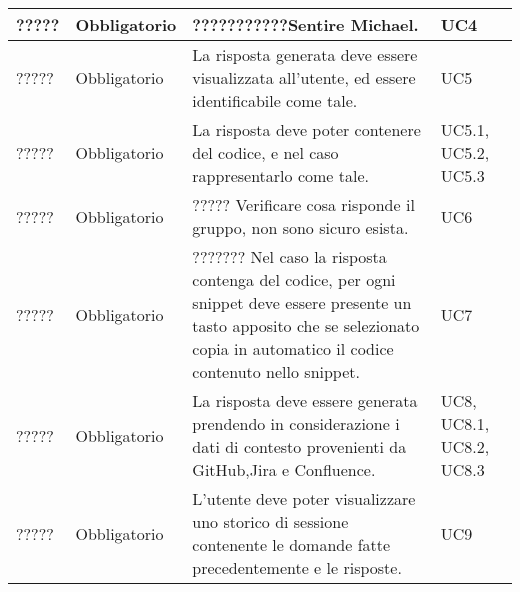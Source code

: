 \begin{table}[h!]
\begin{tabularx}{\textwidth}{|p{2cm}|p{3cm}|X|p{4cm}|}
    ????? & Obbligatorio & ???????????Sentire Michael. & UC4 \\ \hline
    ????? & Obbligatorio & La risposta generata deve essere visualizzata all'utente, ed essere identificabile come tale. & UC5 \\ \hline
    ????? & Obbligatorio & La risposta deve poter contenere del codice, e nel caso rappresentarlo come tale. & UC5.1, UC5.2, UC5.3 \\ \hline
    ????? & Obbligatorio & ????? Verificare cosa risponde il gruppo, non sono sicuro esista. & UC6 \\ \hline
    ????? & Obbligatorio & ???????   Nel caso la risposta contenga del codice, per ogni snippet deve essere presente un tasto apposito che se selezionato copia in automatico il codice contenuto nello snippet. & UC7 \\ \hline
    ????? & Obbligatorio & La risposta deve essere generata prendendo in considerazione i dati di contesto provenienti da GitHub,Jira e Confluence. & UC8, UC8.1, UC8.2, UC8.3 \\ \hline
    ????? & Obbligatorio & L'utente deve poter visualizzare uno storico di sessione contenente le domande fatte precedentemente e le risposte. & UC9 \\ \hline



    \end{tabularx}
    \end{table}

